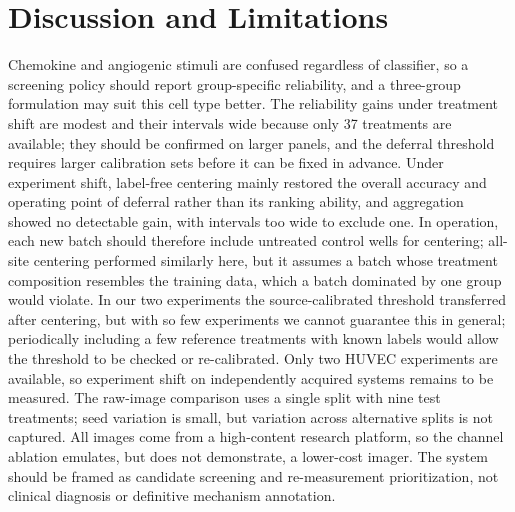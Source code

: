 \documentclass[conference]{IEEEtran}
\begin{document}
\section{Discussion and Limitations}
Chemokine and angiogenic stimuli are confused regardless of classifier, so a screening policy should report group-specific reliability, and a three-group formulation may suit this cell type better. The reliability gains under treatment shift are modest and their intervals wide because only 37 treatments are available; they should be confirmed on larger panels, and the deferral threshold requires larger calibration sets before it can be fixed in advance. Under experiment shift, label-free centering mainly restored the overall accuracy and operating point of deferral rather than its ranking ability, and aggregation showed no detectable gain, with intervals too wide to exclude one. In operation, each new batch should therefore include untreated control wells for centering; all-site centering performed similarly here, but it assumes a batch whose treatment composition resembles the training data, which a batch dominated by one group would violate. In our two experiments the source-calibrated threshold transferred after centering, but with so few experiments we cannot guarantee this in general; periodically including a few reference treatments with known labels would allow the threshold to be checked or re-calibrated. Only two HUVEC experiments are available, so experiment shift on independently acquired systems remains to be measured. The raw-image comparison uses a single split with nine test treatments; seed variation is small, but variation across alternative splits is not captured. All images come from a high-content research platform, so the channel ablation emulates, but does not demonstrate, a lower-cost imager. The system should be framed as candidate screening and re-measurement prioritization, not clinical diagnosis or definitive mechanism annotation.
\end{document}
